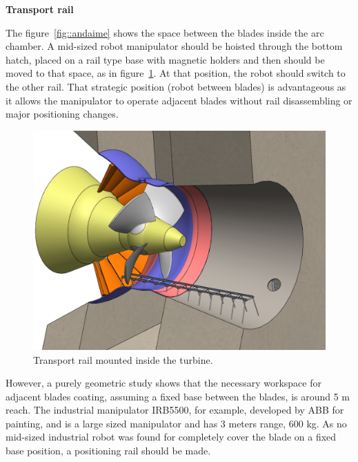\textbf{Transport rail}

The figure~\ref{fig::andaime} shows the space between the blades inside the
arc chamber. A mid-sized robot manipulator should be hoisted through the bottom
hatch, placed on a rail type base with magnetic holders and then should be moved
to that space, as in figure~\ref{fig::rail1}. At that position, the robot should
switch to the other rail. That strategic position (robot between blades) is
advantageous as it allows the manipulator to operate adjacent blades without
rail disassembling or major positioning changes.

\begin{figure}[h!]	
	\includegraphics[width=\columnwidth]{figs/manipuladores/rail1.PNG}
	\caption{Transport rail mounted inside the turbine.}
	\label{fig::rail1}
\end{figure}


However, a purely geometric study shows that the necessary workspace for
adjacent blades coating, assuming a fixed base between the blades,
is around 5 m reach. The industrial manipulator IRB5500, for example, developed
by ABB for painting, and is a large sized manipulator and has 3 meters range,
600 kg.
As no mid-sized industrial robot was found for completely cover
the blade on a fixed base position, a positioning rail should be made.

